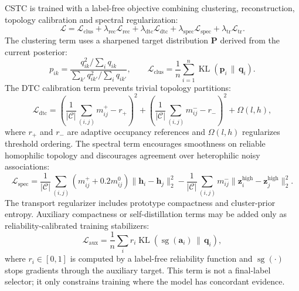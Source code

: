 CSTC is trained with a label-free objective combining clustering, reconstruction, topology calibration and spectral regularization:
\begin{equation}
  \mathcal{L}
  =
  \mathcal{L}_{\mathrm{clus}}
  + \lambda_{\mathrm{rec}}\mathcal{L}_{\mathrm{rec}}
  + \lambda_{\mathrm{dtc}}\mathcal{L}_{\mathrm{dtc}}
  + \lambda_{\mathrm{spec}}\mathcal{L}_{\mathrm{spec}}
  + \lambda_{\mathrm{tr}}\mathcal{L}_{\mathrm{tr}}.
\end{equation}
The clustering term uses a sharpened target distribution $\mathbf{P}$ derived from the current posterior:
\begin{equation}
  p_{ik}
  =
  \frac{q_{ik}^{2}/\sum_i q_{ik}}
  {\sum_{k'} q_{ik'}^{2}/\sum_i q_{ik'}},
  \qquad
  \mathcal{L}_{\mathrm{clus}}
  =
  \frac{1}{n}\sum_{i=1}^{n}
  \operatorname{KL}(\mathbf{p}_i\,\|\,\mathbf{q}_i).
\end{equation}
The DTC calibration term prevents trivial topology partitions:
\begin{equation}
  \mathcal{L}_{\mathrm{dtc}}
  =
  \left(\frac{1}{|\mathcal{C}|}\sum_{(i,j)}m^{+}_{ij}-r_{+}\right)^2
  +
  \left(\frac{1}{|\mathcal{C}|}\sum_{(i,j)}m^{-}_{ij}-r_{-}\right)^2
  +
  \Omega(l,h),
\end{equation}
where $r_{+}$ and $r_{-}$ are adaptive occupancy references and $\Omega(l,h)$ regularizes threshold ordering. The spectral term encourages smoothness on reliable homophilic topology and discourages agreement over heterophilic noisy associations:
\begin{equation}
  \mathcal{L}_{\mathrm{spec}}
  =
  \frac{1}{|\mathcal{C}|}
  \sum_{(i,j)}
  (m^{+}_{ij}+0.2m^{0}_{ij})
  \|\mathbf{h}_i-\mathbf{h}_j\|_2^2
  -
  \frac{1}{|\mathcal{C}|}
  \sum_{(i,j)}
  m^{-}_{ij}
  \|\mathbf{z}^{\mathrm{high}}_i-\mathbf{z}^{\mathrm{high}}_j\|_2^2 .
\end{equation}
The transport regularizer includes prototype compactness and cluster-prior entropy. Auxiliary compactness or self-distillation terms may be added only as reliability-calibrated training stabilizers:
\begin{equation}
  \mathcal{L}_{\mathrm{aux}}
  =
  \frac{1}{n}\sum_i r_i
  \operatorname{KL}
  \left(
  \operatorname{sg}(\mathbf{a}_i)\,\|\,\mathbf{q}_i
  \right),
\end{equation}
where $r_i\in[0,1]$ is computed by a label-free reliability function and $\operatorname{sg}(\cdot)$ stops gradients through the auxiliary target. This term is not a final-label selector; it only constrains training where the model has concordant evidence.

